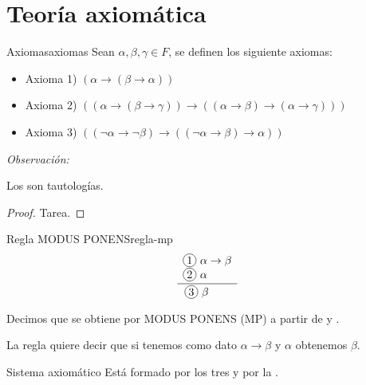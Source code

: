 \pagebreak
\section{Teoría axiomática}

\begin{definicion}{Axiomas}{axiomas}
    Sean $\alpha, \beta, \gamma \in F$, se definen los siguiente axiomas:

    \medskip

    \begin{itemize}
        \item Axioma 1) $(\alpha \to (\beta \to \alpha))$
        \item Axioma 2) $((\alpha \to (\beta\to\gamma )) \to 
            ((\alpha\to\beta) \to (\alpha \to \gamma)))$
        \item Axioma 3) $((\neg \alpha \to \neg\beta) \to 
            ((\neg \alpha \to \beta) \to \alpha))$
    \end{itemize}
\end{definicion}

\bigskip
\textit{Observación:}

Los  son tautologías.

\begin{proof} \phantom{.}
    Tarea.
\end{proof}


\begin{definicion}{Regla MODUS PONENS}{regla-mp}
    \begin{equation*}
    \frac{
        \begin{array}[b]{l}
            \circled{1} ~ \alpha \to \beta \\
            \circled{2} ~ \alpha
        \end{array}
    }{
            \circled{3} ~ \beta \phantom{\to \beta}
    }
    \end{equation*}

    \medskip

    Decimos que  se obtiene por MODUS PONENS (MP) a partir
    de  y .
\end{definicion}

La regla quiere decir que si tenemos como dato $\alpha\to\beta$ y 
$\alpha$ obtenemos $\beta$.

\medskip

\begin{definicion}{Sistema axiomático}{}
    Está formado por los tres  y por la
    .
\end{definicion}


